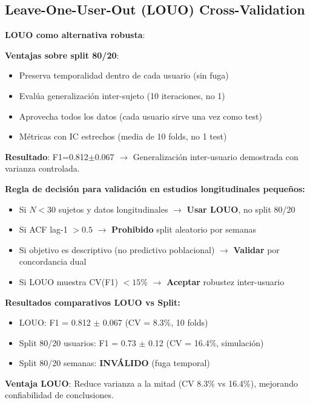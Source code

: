 \documentclass[12pt,letterpaper,twoside]{report}
\begin{document}
\subsection{Leave-One-User-Out (LOUO) Cross-Validation}

\begin{estadisticobox}
\textbf{LOUO como alternativa robusta}:

\textbf{Ventajas sobre split 80/20}:
\begin{itemize}[noitemsep]
    \item Preserva temporalidad dentro de cada usuario (sin fuga)
    \item Evalúa generalización inter-sujeto (10 iteraciones, no 1)
    \item Aprovecha todos los datos (cada usuario sirve una vez como test)
    \item Métricas con IC estrechos (media de 10 folds, no 1 test)
\end{itemize}

\textbf{Resultado}: F1=0.812$\pm$0.067 $\to$ Generalización inter-usuario demostrada con varianza controlada.
\end{estadisticobox}

\begin{reglabox}
\textbf{Regla de decisión para validación en estudios longitudinales pequeños:}

\begin{itemize}[noitemsep]
    \item Si $N < 30$ sujetos y datos longitudinales $\to$ \textbf{Usar LOUO}, no split 80/20
    \item Si ACF lag-1 $> 0.5$ $\to$ \textbf{Prohibido} split aleatorio por semanas
    \item Si objetivo es descriptivo (no predictivo poblacional) $\to$ \textbf{Validar} por concordancia dual
    \item Si LOUO muestra CV(F1) $< 15\%$ $\to$ \textbf{Aceptar} robustez inter-usuario
\end{itemize}
\end{reglabox}

\begin{calculobox}
\textbf{Resultados comparativos LOUO vs Split:}

\begin{itemize}[noitemsep]
    \item LOUO: F1 = 0.812 $\pm$ 0.067 (CV = 8.3\%, 10 folds)
    \item Split 80/20 usuarios: F1 = 0.73 $\pm$ 0.12 (CV = 16.4\%, simulación)
    \item Split 80/20 semanas: \textbf{INVÁLIDO} (fuga temporal)
\end{itemize}

\textbf{Ventaja LOUO}: Reduce varianza a la mitad (CV 8.3\% vs 16.4\%), mejorando confiabilidad de conclusiones.
\end{calculobox}
\end{document}
